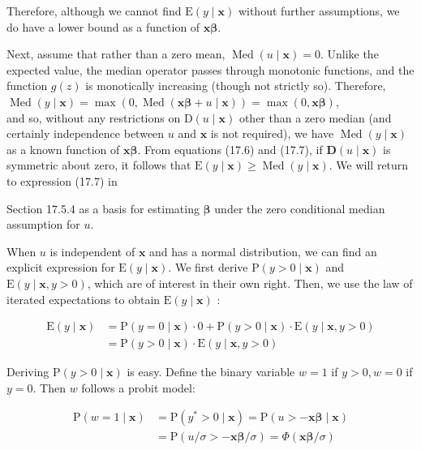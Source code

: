 \documentclass[10pt]{article}
\begin{document}
Therefore, although we cannot find $\mathrm{E}(y \mid \mathbf{x})$ without further assumptions, we do have a lower bound as a function of $\mathbf{x} \boldsymbol{\beta}$.

Next, assume that rather than a zero mean, $\operatorname{Med}(u \mid \mathbf{x})=0$. Unlike the expected value, the median operator passes through monotonic functions, and the function $g(z)$ is monotically increasing (though not strictly so). Therefore,\\
$\operatorname{Med}(y \mid \mathbf{x})=\max (0, \operatorname{Med}(\mathbf{x} \boldsymbol{\beta}+u \mid \mathbf{x}))=\max (0, \mathbf{x} \boldsymbol{\beta})$,\\
and so, without any restrictions on $\mathrm{D}(u \mid \mathbf{x})$ other than a zero median (and certainly independence between $u$ and $\mathbf{x}$ is not required), we have $\operatorname{Med}(y \mid \mathbf{x})$ as a known function of $\mathbf{x} \boldsymbol{\beta}$. From equations (17.6) and (17.7), if $\mathbf{D}(u \mid \mathbf{x})$ is symmetric about zero, it follows that $\mathrm{E}(y \mid \mathbf{x}) \geq \operatorname{Med}(y \mid \mathbf{x})$. We will return to expression (17.7) in

Section 17.5.4 as a basis for estimating $\boldsymbol{\beta}$ under the zero conditional median assumption for $u$.

When $u$ is independent of $\mathbf{x}$ and has a normal distribution, we can find an explicit expression for $\mathrm{E}(y \mid \mathbf{x})$. We first derive $\mathrm{P}(y>0 \mid \mathbf{x})$ and $\mathrm{E}(y \mid \mathbf{x}, y>0)$, which are of interest in their own right. Then, we use the law of iterated expectations to obtain $\mathrm{E}(y \mid \mathbf{x})$ :


\begin{align*}
\mathrm{E}(y \mid \mathbf{x}) & =\mathrm{P}(y=0 \mid \mathbf{x}) \cdot 0+\mathrm{P}(y>0 \mid \mathbf{x}) \cdot \mathrm{E}(y \mid \mathbf{x}, y>0) \\
& =\mathrm{P}(y>0 \mid \mathbf{x}) \cdot \mathrm{E}(y \mid \mathbf{x}, y>0) \tag{17.8}
\end{align*}


Deriving $\mathrm{P}(y>0 \mid \mathbf{x})$ is easy. Define the binary variable $w=1$ if $y>0, w=0$ if $y=0$. Then $w$ follows a probit model:


\begin{align*}
\mathrm{P}(w=1 \mid \mathbf{x}) & =\mathrm{P}\left(y^{*}>0 \mid \mathbf{x}\right)=\mathrm{P}(u>-\mathbf{x} \boldsymbol{\beta} \mid \mathbf{x}) \\
& =\mathrm{P}(u / \sigma>-\mathbf{x} \boldsymbol{\beta} / \sigma)=\Phi(\mathbf{x} \boldsymbol{\beta} / \sigma) \tag{17.9}
\end{align*}
\end{document}
